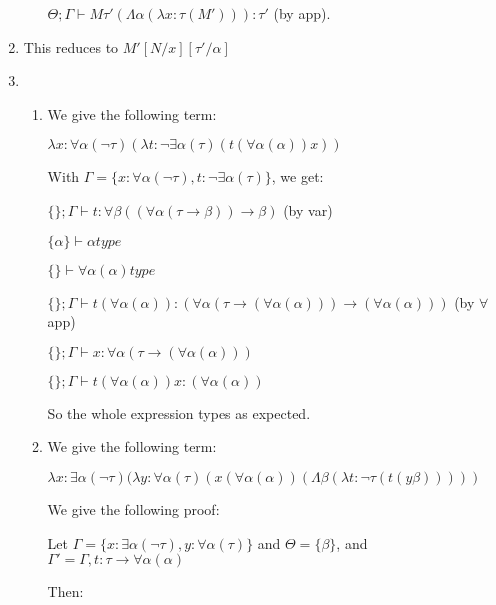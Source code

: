 \begin{enumerate}[label=(\alph*)]
\begin{enumerate}[label=(\roman*)]
                $\Theta;\Gamma \vdash M \tau' (\Lambda \alpha (\lambda x:\tau (M'))) : \tau'$ (by app).
        \end{enumerate}

    \item
        This reduces to $M'[N / x][\tau' / \alpha]$

    \item
        \begin{enumerate}[label=(\roman*)]
            \item
                We give the following term:

                $\lambda x : \forall \alpha(\neg \tau) (\lambda t : \neg \exists \alpha (\tau) (t (\forall \alpha (\alpha)) x))$

                With $\Gamma = \{x : \forall \alpha(\neg \tau), t : \neg \exists \alpha(\tau)\}$, we get:

                $\{\};\Gamma \vdash t : \forall \beta((\forall \alpha (\tau \rightarrow \beta)) \rightarrow \beta)$  (by var)

                $\{\alpha\} \vdash  \alpha type$

                $\{\} \vdash \forall \alpha(\alpha) type$
                
                $\{\};\Gamma \vdash t (\forall \alpha(\alpha)) : (\forall \alpha (\tau \rightarrow (\forall \alpha(\alpha))) \rightarrow (\forall \alpha(\alpha)))$ (by $\forall$ app)

                $\{\};\Gamma \vdash x : \forall \alpha( \tau \rightarrow (\forall \alpha (\alpha)))$

                $\{\};\Gamma \vdash t (\forall \alpha(\alpha)) x  : (\forall \alpha(\alpha))$

                So the whole expression types as expected.

            \item
                We give the following term:

                $\lambda x: \exists \alpha(\neg \tau) (\lambda y : \forall \alpha(\tau) (x (\forall \alpha (\alpha)) (\Lambda \beta (\lambda t : \neg\tau  (t (y \beta)))))$

                We give the following proof:

                Let $\Gamma = \{x : \exists \alpha(\neg \tau), y : \forall \alpha(\tau)\}$ and $\Theta = \{\beta\}$, and $\Gamma' = \Gamma, t : \tau \rightarrow  \forall \alpha(\alpha)$

                Then:


\end{enumerate}
\end{enumerate}
